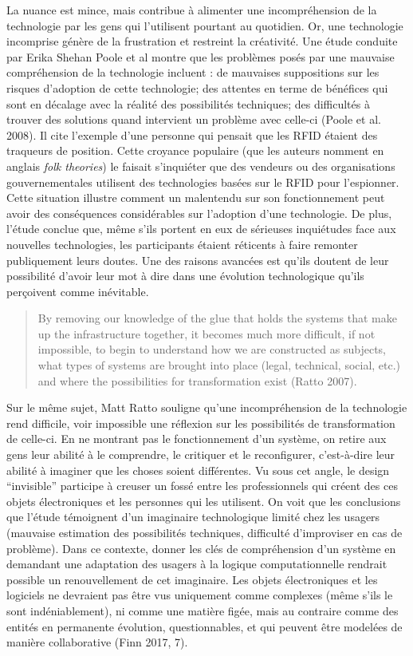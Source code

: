 \documentclass[]{article}
\begin{document}
La nuance est mince, mais contribue à alimenter une incompréhension de
la technologie par les gens qui l'utilisent pourtant au quotidien. Or,
une technologie incomprise génère de la frustration et restreint la
créativité. Une étude conduite par Erika Shehan Poole et al montre que
les problèmes posés par une mauvaise compréhension de la technologie
incluent : de mauvaises suppositions sur les risques d'adoption de cette
technologie; des attentes en terme de bénéfices qui sont en décalage
avec la réalité des possibilités techniques; des difficultés à trouver
des solutions quand intervient un problème avec celle-ci (Poole et al.
2008). Il cite l'exemple d'une personne qui pensait que les RFID étaient
des traqueurs de position. Cette croyance populaire (que les auteurs
nomment en anglais \emph{folk theories}) le faisait s'inquiéter que des
vendeurs ou des organisations gouvernementales utilisent des
technologies basées sur le RFID pour l'espionner. Cette situation
illustre comment un malentendu sur son fonctionnement peut avoir des
conséquences considérables sur l'adoption d'une technologie. De plus,
l'étude conclue que, même s'ils portent en eux de sérieuses inquiétudes
face aux nouvelles technologies, les participants étaient réticents à
faire remonter publiquement leurs doutes. Une des raisons avancées est
qu'ils doutent de leur possibilité d'avoir leur mot à dire dans une
évolution technologique qu'ils perçoivent comme inévitable.

\begin{quote}
By removing our knowledge of the glue that holds the systems that make
up the infrastructure together, it becomes much more difficult, if not
impossible, to begin to understand how we are constructed as subjects,
what types of systems are brought into place (legal, technical, social,
etc.) and where the possibilities for transformation exist (Ratto 2007).
\end{quote}

Sur le même sujet, Matt Ratto souligne qu'une incompréhension de la
technologie rend difficile, voir impossible une réflexion sur les
possibilités de transformation de celle-ci. En ne montrant pas le
fonctionnement d'un système, on retire aux gens leur abilité à le
comprendre, le critiquer et le reconfigurer, c'est-à-dire leur abilité à
imaginer que les choses soient différentes. Vu sous cet angle, le design
``invisible'' participe à creuser un fossé entre les professionnels qui
créent des ces objets électroniques et les personnes qui les utilisent.
On voit que les conclusions que l'étude témoignent d'un imaginaire
technologique limité chez les usagers (mauvaise estimation des
possibilités techniques, difficulté d'improviser en cas de problème).
Dans ce contexte, donner les clés de compréhension d'un système en
demandant une adaptation des usagers à la logique computationnelle
rendrait possible un renouvellement de cet imaginaire. Les objets
électroniques et les logiciels ne devraient pas être vus uniquement
comme complexes (même s'ils le sont indéniablement), ni comme une
matière figée, mais au contraire comme des entités en permanente
évolution, questionnables, et qui peuvent être modelées de manière
collaborative (Finn 2017, 7).
\end{document}
